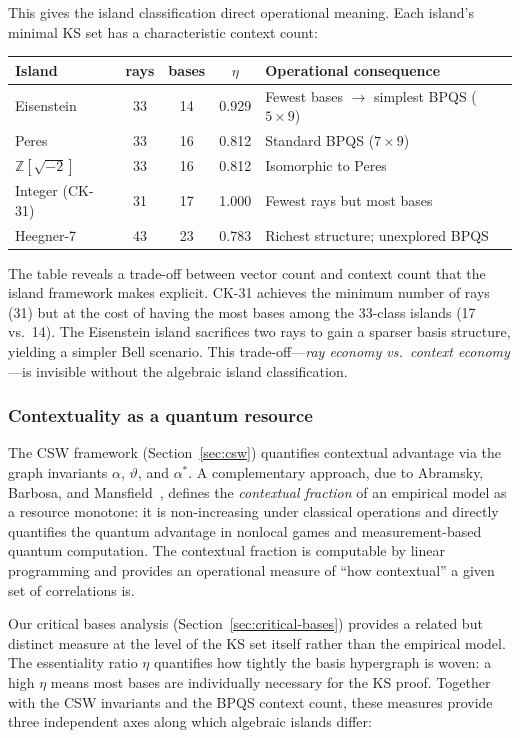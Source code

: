 \documentclass[12pt,a4paper]{article}
\newcommand{\Z}{\mathbb{Z}}
\begin{document}
This gives the island classification direct operational meaning. Each island's minimal KS set has a characteristic context count:

\begin{center}
\begin{tabular}{lcccl}
\toprule
Island & rays & bases & $\eta$ & Operational consequence \\
\midrule
Eisenstein & 33 & 14 & 0.929 & Fewest bases $\to$ simplest BPQS ($5 \times 9$) \\
Peres & 33 & 16 & 0.812 & Standard BPQS ($7 \times 9$) \\
$\Z[\sqrt{-2}]$ & 33 & 16 & 0.812 & Isomorphic to Peres \\
Integer (CK-31) & 31 & 17 & 1.000 & Fewest rays but most bases \\
Heegner-7 & 43 & 23 & 0.783 & Richest structure; unexplored BPQS \\
\bottomrule
\end{tabular}
\end{center}

\noindent The table reveals a trade-off between vector count and context count that the island framework makes explicit. CK-31 achieves the minimum number of rays (31) but at the cost of having the most bases among the 33-class islands (17 vs.\ 14). The Eisenstein island sacrifices two rays to gain a sparser basis structure, yielding a simpler Bell scenario. This trade-off---\emph{ray economy vs.\ context economy}---is invisible without the algebraic island classification.

\subsubsection{Contextuality as a quantum resource}

The CSW framework (Section~\ref{sec:csw}) quantifies contextual advantage via the graph invariants $\alpha$, $\vartheta$, and $\alpha^*$. A complementary approach, due to Abramsky, Barbosa, and Mansfield~\cite{AbramskyBarbosaMansfield2017}, defines the \emph{contextual fraction} of an empirical model as a resource monotone: it is non-increasing under classical operations and directly quantifies the quantum advantage in nonlocal games and measurement-based quantum computation. The contextual fraction is computable by linear programming and provides an operational measure of ``how contextual'' a given set of correlations is.

Our critical bases analysis (Section~\ref{sec:critical-bases}) provides a related but distinct measure at the level of the KS set itself rather than the empirical model. The essentiality ratio $\eta$ quantifies how tightly the basis hypergraph is woven: a high $\eta$ means most bases are individually necessary for the KS proof. Together with the CSW invariants and the BPQS context count, these measures provide three independent axes along which algebraic islands differ:
\end{document}
